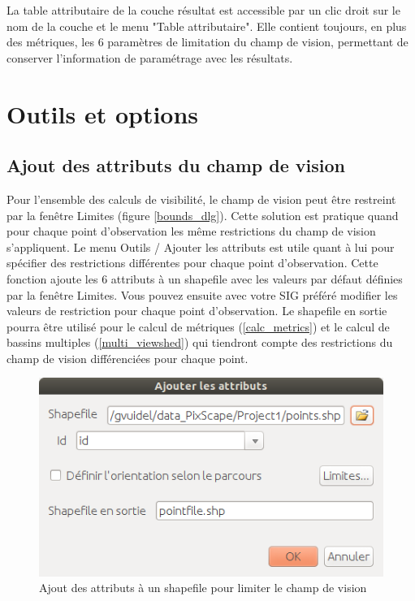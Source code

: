 \documentclass{report}
\begin{document}
La table attributaire de la couche résultat est accessible par un clic droit sur le nom de la couche et le menu "Table attributaire". Elle contient toujours, en plus des métriques, les 6 paramètres de limitation du champ de vision, permettant de conserver l'information de paramétrage avec les résultats.

\section{Outils et options}
\label{tools}

\subsection{Ajout des attributs du champ de vision}
\label{add_attributes}
Pour l'ensemble des calculs de visibilité, le champ de vision peut être restreint par la fenêtre Limites (figure \ref{bounds_dlg}). Cette solution est pratique quand pour chaque point d'observation les même restrictions du champ de vision s'appliquent. 
Le menu Outils / Ajouter les attributs est utile quant à lui pour spécifier des restrictions différentes pour chaque point d'observation. Cette fonction ajoute les 6 attributs à un shapefile avec les valeurs par défaut définies par la fenêtre Limites. Vous pouvez ensuite avec votre SIG préféré modifier les valeurs de restriction pour chaque point d'observation. 
Le shapefile en sortie pourra être utilisé pour le calcul de métriques (\ref{calc_metrics}) et le calcul de bassins multiples (\ref{multi_viewshed}) qui tiendront compte des restrictions du champ de vision différenciées pour chaque point.

\begin{figure}[H]
	\includegraphics[scale=0.5]{img/add_attributes-fr.png} 
	\caption{Ajout des attributs à un shapefile pour limiter le champ de vision}
	\label{add_attributes_dlg}
\end{figure}
\end{document}
